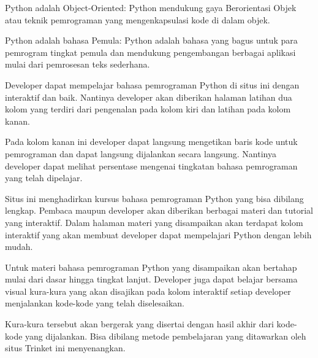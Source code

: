\noindent 
{\fontsize{14pt}{14pt}\selectfont Python adalah Object-Oriented: Python mendukung gaya Berorientasi Objek atau teknik pemrograman yang mengenkapsulasi kode di dalam objek. \\} \par
\vspace{14pt}
\noindent 
{\fontsize{14pt}{14pt}\selectfont Python adalah bahasa Pemula: Python adalah bahasa yang bagus untuk para pemrogram tingkat pemula dan mendukung pengembangan berbagai aplikasi mulai dari pemrosesan teks sederhana. \\} \par
\noindent 
{\fontsize{14pt}{14pt}\selectfont Developer dapat mempelajar bahasa pemrograman Python di situs ini dengan interaktif dan baik. Nantinya developer akan diberikan halaman latihan dua kolom yang terdiri dari pengenalan pada kolom kiri dan latihan pada kolom kanan. \\} \par
\noindent 
{\fontsize{14pt}{14pt}\selectfont Pada kolom kanan ini developer dapat langsung mengetikan baris kode untuk pemrograman dan dapat langsung dijalankan secara langsung. Nantinya developer dapat melihat persentase mengenai tingkatan bahasa pemrograman yang telah dipelajar. \\} \par
\vspace{14pt}
\noindent 
{\fontsize{14pt}{14pt}\selectfont Situs ini menghadirkan kursus bahasa pemrograman Python yang bisa dibilang lengkap.  $  $Pembaca maupun developer akan diberikan berbagai materi dan tutorial yang interaktif. Dalam halaman materi yang disampaikan akan terdapat kolom interaktif yang akan membuat developer dapat mempelajari Python dengan lebih mudah. \\} \par
\noindent 
{\fontsize{14pt}{14pt}\selectfont Untuk materi bahasa pemrograman Python yang disampaikan akan bertahap mulai dari dasar hingga tingkat lanjut. Developer juga dapat belajar bersama visual kura-kura yang akan disajikan pada kolom interaktif setiap developer menjalankan kode-kode yang telah diselesaikan. \\} \par
\noindent 
{\fontsize{14pt}{14pt}\selectfont Kura-kura tersebut akan bergerak yang disertai dengan hasil akhir dari kode-kode yang dijalankan. Bisa dibilang metode pembelajaran yang ditawarkan oleh situs Trinket ini menyenangkan. \\} \par

